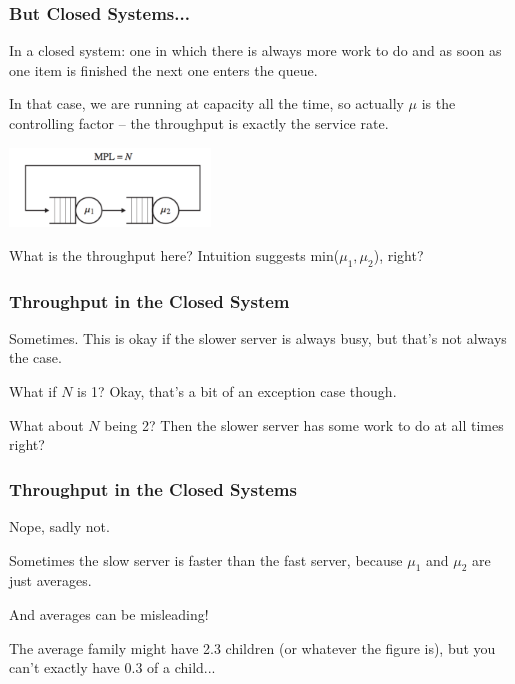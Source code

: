 \begin{frame}
\frametitle{But Closed Systems...}


In a closed system: one in which there is always more work to do and as soon as one item is finished the next one enters the queue. 

 In that case, we are running at capacity all the time, so actually $\mu$ is the controlling factor -- the throughput is exactly the service rate. 
 
 \begin{center}
	\includegraphics[width=0.4\textwidth]{images/tandem-closed.png}
\end{center}

What is the throughput here?  Intuition suggests min($\mu_{1}, \mu_{2}$), right? 

\end{frame}



\begin{frame}
\frametitle{Throughput in the Closed System}



Sometimes. This is okay if the slower server is always busy, but that's not always the case. 

What if $N$ is 1? Okay, that's a bit of an exception case though. 

What about $N$ being 2? Then the slower server has some work to do at all times right?

\end{frame}



\begin{frame}
\frametitle{Throughput in the Closed Systems}

Nope, sadly not. 

Sometimes the slow server is faster than the fast server, because $\mu_{1}$ and $\mu_{2}$ are just averages. 

And averages can be misleading! 

The average family might have 2.3 children (or whatever the figure is), but you can't exactly have 0.3 of a child...

\end{frame}



